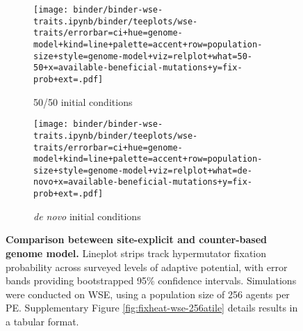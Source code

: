 \begin{sidewaysfigure}[h]
\begin{subfigure}{0.5\linewidth}
  \texttt{[image: binder/binder-wse-traits.ipynb/binder/teeplots/wse-traits/errorbar=ci+hue=genome-model+kind=line+palette=accent+row=population-size+style=genome-model+viz=relplot+what=50-50+x=available-beneficial-mutations+y=fix-prob+ext=.pdf]}%
  \caption{50/50 initial conditions}
\end{subfigure}%
\begin{subfigure}{0.5\linewidth}
  \texttt{[image: binder/binder-wse-traits.ipynb/binder/teeplots/wse-traits/errorbar=ci+hue=genome-model+kind=line+palette=accent+row=population-size+style=genome-model+viz=relplot+what=de-novo+x=available-beneficial-mutations+y=fix-prob+ext=.pdf]}%
  \caption{\textit{de novo} initial conditions}
\end{subfigure}

\begin{minipage}{\textwidth}
  \caption{
  \textbf{Comparison beteween site-explicit and counter-based genome model.}
  \footnotesize
  Lineplot strips track hypermutator fixation probability across surveyed levels of adaptive potential, with error bands providing bootstrapped 95\% confidence intervals.
  Simulations were conducted on WSE, using a population size of 256 agents per PE.
  Supplementary Figure \ref{fig:fixheat-wse-256atile} details results in a tabular format.
    }
    \label{fig:wse-site-explicit-counter-based}
  \end{minipage}
\end{sidewaysfigure}
